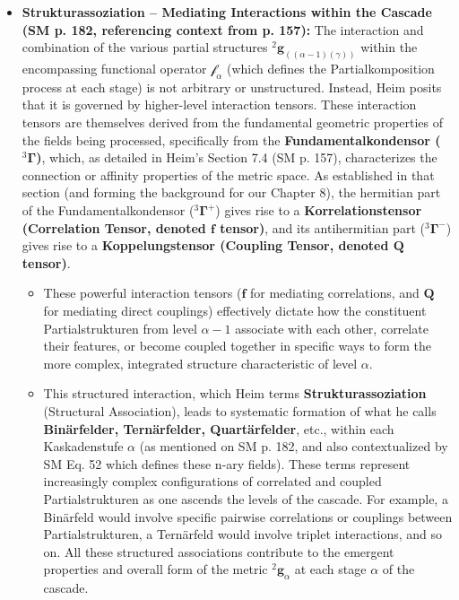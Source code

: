 \documentclass[12pt]{article}
\newcommand{\kompositionsfeld}{{}^2\mathbf{g}}
\newcommand{\partialstruktur}[1]{{}^2\mathbf{g}_{(#1)}} %
\newcommand{\fundamentalkondensor}{{}^3\bm{\Gamma}}
\newcommand{\korrelationstensor}{\mathbf{f}}
\newcommand{\koppelungstensor}{\mathbf{Q}}
\newcommand{\kaskadenstufe}{\alpha}
\begin{document}
\begin{itemize}
    \item \textbf{Strukturassoziation – Mediating Interactions within the Cascade (SM p. 182, referencing context from p. 157):}
    The interaction and combination of the various partial structures \( \partialstruktur{(\alpha-1)(\gamma)} \) within the encompassing functional operator \( \mathcal{f}_\alpha \) (which defines the Partialkomposition process at each stage) is not arbitrary or unstructured. Instead, Heim posits that it is governed by higher-level interaction tensors. These interaction tensors are themselves derived from the fundamental geometric properties of the fields being processed, specifically from the \textbf{Fundamentalkondensor (\( \fundamentalkondensor \))}, which, as detailed in Heim's Section 7.4 (SM p. 157), characterizes the connection or affinity properties of the metric space. As established in that section (and forming the background for our Chapter 8), the hermitian part of the Fundamentalkondensor (\( \fundamentalkondensor^+ \)) gives rise to a \textbf{Korrelationstensor (Correlation Tensor, denoted \( \korrelationstensor \) tensor)}, and its antihermitian part (\( \fundamentalkondensor^- \)) gives rise to a \textbf{Koppelungstensor (Coupling Tensor, denoted \( \koppelungstensor \) tensor)}.
    \begin{itemize}
        \item These powerful interaction tensors (\( \korrelationstensor \) for mediating correlations, and \( \koppelungstensor \) for mediating direct couplings) effectively dictate how the constituent Partialstrukturen from level \( \alpha-1 \) associate with each other, correlate their features, or become coupled together in specific ways to form the more complex, integrated structure characteristic of level \( \alpha \).
        \item This structured interaction, which Heim terms \textbf{Strukturassoziation} (Structural Association), leads to systematic formation of what he calls \textbf{Binärfelder, Ternärfelder, Quartärfelder}, etc., within each Kaskadenstufe \( \kaskadenstufe \) (as mentioned on SM p. 182, and also contextualized by SM Eq. 52 which defines these n-ary fields). These terms represent increasingly complex configurations of correlated and coupled Partialstrukturen as one ascends the levels of the cascade. For example, a Binärfeld would involve specific pairwise correlations or couplings between Partialstrukturen, a Ternärfeld would involve triplet interactions, and so on. All these structured associations contribute to the emergent properties and overall form of the metric \( \kompositionsfeld_\alpha \) at each stage \( \alpha \) of the cascade.
    \end{itemize}
\end{itemize}
\end{document}
